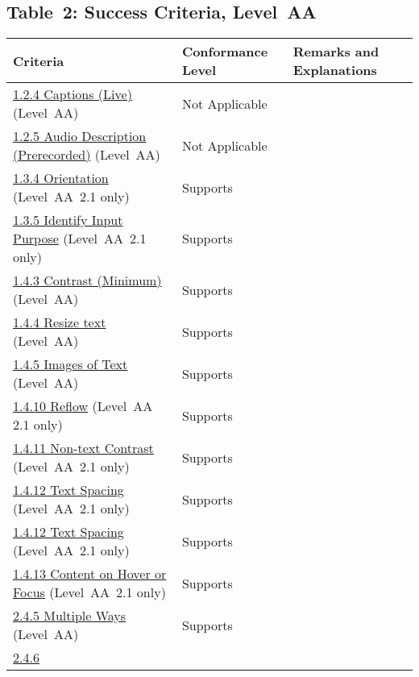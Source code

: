 \documentclass{report}
\begin{document}
\subsection{Table~2:  Success Criteria, Level~AA}
\label{sec:WCAG-AA}
\begin{longtable}{p{}<{\RaggedRight}p{}<{\RaggedRight}p{}<{\RaggedRight}}
  \toprule
  Criteria & Conformance Level & Remarks and Explanations \\
  \midrule
  \endhead
  \bottomrule
  \endfoot
  \href{http://www.w3.org/TR/WCAG20/#media-equiv-real-time-captions}{1.2.4
  Captions (Live)} (Level~AA) & Not Applicable\\
  \href{http://www.w3.org/TR/WCAG20/#media-equiv-audio-desc-only}{1.2.5
  Audio Description (Prerecorded)} (Level~AA) & Not Applicable\\
  \href{https://www.w3.org/TR/WCAG21/#orientation}{1.3.4 Orientation}
  (Level~AA~2.1 only) & Supports\\
  \href{https://www.w3.org/TR/WCAG21/#identify-input-purpose}{1.3.5
  Identify Input Purpose} (Level~AA~2.1 only) & Supports\\
  \href{http://www.w3.org/TR/WCAG20/#visual-audio-contrast-contrast}{1.4.3
  Contrast (Minimum)} (Level~AA) & Supports\\
  \href{https://www.w3.org/TR/WCAG21/#resize-text}{1.4.4 Resize text}
  (Level~AA) & Supports\\
  \href{http://www.w3.org/TR/WCAG20/#visual-audio-contrast-text-presentation}{1.4.5
  Images of Text} (Level~AA) & Supports\\
  \href{https://www.w3.org/TR/WCAG21/#reflow}{1.4.10 Reflow} (Level~AA
  2.1 only) & Supports\\
  \href{https://www.w3.org/TR/WCAG21/#non-text-contrast}{1.4.11
  Non-text Contrast} (Level~AA~2.1 only) & Supports\\
  \href{https://www.w3.org/TR/WCAG21/#text-spacing}{1.4.12 Text
  Spacing} (Level~AA~2.1 only) & Supports\\
  \href{https://www.w3.org/TR/WCAG21/#text-spacing}{1.4.12 Text
  Spacing} (Level~AA~2.1 only) & Supports\\
  \href{https://www.w3.org/TR/WCAG21/#content-on-hover-or-focus}{1.4.13
  Content on Hover or Focus} (Level~AA~2.1 only) & Supports\\
  \href{http://www.w3.org/TR/WCAG20/#navigation-mechanisms-mult-loc}{2.4.5
  Multiple Ways} (Level~AA) & Supports\\
  \href{http://www.w3.org/TR/WCAG20/#navigation-mechanisms-descriptive}{2.4.6
}
\end{longtable}
\end{document}
